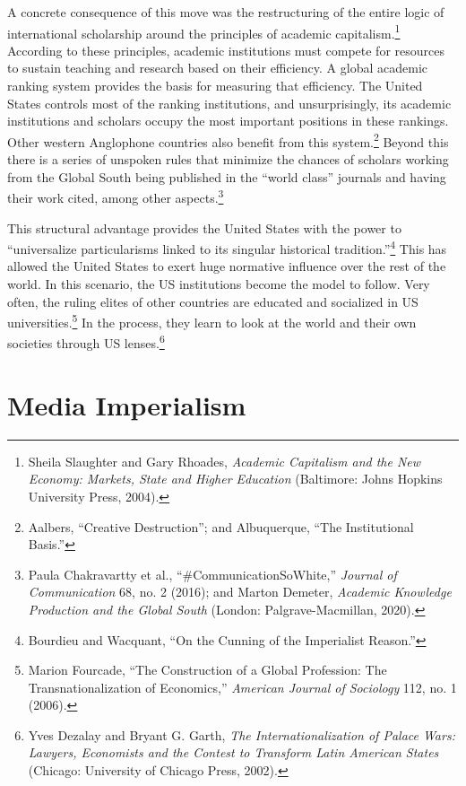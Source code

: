 \documentclass{tufte-handout}
\begin{document}
A concrete consequence of this move was the restructuring of the entire
logic of international scholarship around the principles of academic
capitalism.\footnote{Sheila Slaughter and Gary Rhoades, \emph{Academic
  Capitalism and the New Economy: Markets, State and Higher Education}
  (Baltimore: Johns Hopkins University Press, 2004).} According to these
principles, academic institutions must compete for resources to sustain
teaching and research based on their efficiency. A global academic
ranking system provides the basis for measuring that efficiency. The
United States controls most of the ranking institutions, and
unsurprisingly, its academic institutions and scholars occupy the most
important positions in these rankings. Other western Anglophone
countries also benefit from this system.\footnote{Aalbers, ``Creative
  Destruction''; and Albuquerque, ``The Institutional Basis.''} Beyond
this there is a series of unspoken rules that minimize the chances of
scholars working from the Global South being published in the ``world
class'' journals and having their work cited, among other
aspects.\footnote{Paula Chakravartty et al., ``\#CommunicationSoWhite,''
  \emph{Journal of Communication} 68, no. 2 (2016); and Marton Demeter,
  \emph{Academic Knowledge Production and the Global South} (London:
  Palgrave-Macmillan, 2020).}

This structural advantage provides the United States with the power to
``universalize particularisms linked to its singular historical
tradition.''\footnote{Bourdieu and Wacquant, ``On the Cunning of the
  Imperialist Reason.''} This has allowed the United States to exert
huge normative influence over the rest of the world. In this scenario,
the US institutions become the model to follow. Very often, the ruling
elites of other countries are educated and socialized in US
universities.\footnote{Marion Fourcade, ``The Construction of a Global
  Profession: The Transnationalization of Economics,'' \emph{American
  Journal of Sociology} 112, no. 1 (2006).} In the process, they learn
to look at the world and their own societies through US
lenses.\footnote{Yves Dezalay and Bryant G. Garth, \emph{The
  Internationalization of Palace Wars: Lawyers, Economists and the
  Contest to Transform Latin American States} (Chicago: University of
  Chicago Press, 2002).}

\hypertarget{media-imperialism}{%
\section{Media Imperialism}\label{media-imperialism}}
\end{document}
